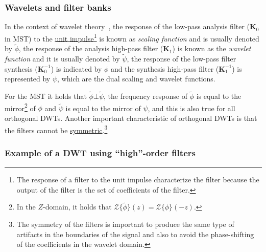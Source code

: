 
\subsubsection{Wavelets and filter banks}

In the context of wavelet theory~\cite{burrus2013wavelets}, the
response of the low-pass analysis filter (${\mathbf K}_0$ in MST)
to the
\href{https://en.wikipedia.org/?title=Unit_impulse&redirect=no}{unit
  impulse}\footnote{The response of a filter to the unit impulse
characterize the filter because the output of the filter is the set of
coefficients of the filter.} is known as \emph{scaling function} and is
usually denoted by $\tilde\phi$, the response of the analysis
high-pass filter (${\mathbf K}_1$) is known as the \emph{wavelet
function} and it is usually denoted by $\tilde\psi$, the response of
the low-pass filter synthesis (${\mathbf K}^{-1}_0$) is indicated by
$\phi$ and the synthesis high-pass filter (${\mathbf K}^{-1}_1$) is
represented by $\psi$, which are the dual scaling and wavelet functions.

For the MST it holds that $\tilde\phi\bot\tilde\psi$, the frequency
response of $\tilde\phi$ is equal to the mirror\footnote{In the
  $Z$-domain, it holds that
  ${\mathcal Z}\{\tilde\phi\}(z)={\mathcal Z}\{\phi\}(-z)$.} of $\phi$
and $\tilde\psi$ is equal to the mirror of $\psi$, and this is also
true for all orthogonal DWTs. Another important characteristic of
orthogonal DWTs is that the filters cannot be
\href{https://en.wikipedia.org/wiki/Symmetry}{symmetric}.\footnote{The
  symmetry of the filters is important to produce the same type of
  artifacts in the boundaries of the signal and also to avoid the
  phase-shifting of the coefficients in the wavelet domain.}



\subsubsection{Example of a DWT using ``high''-order filters}

